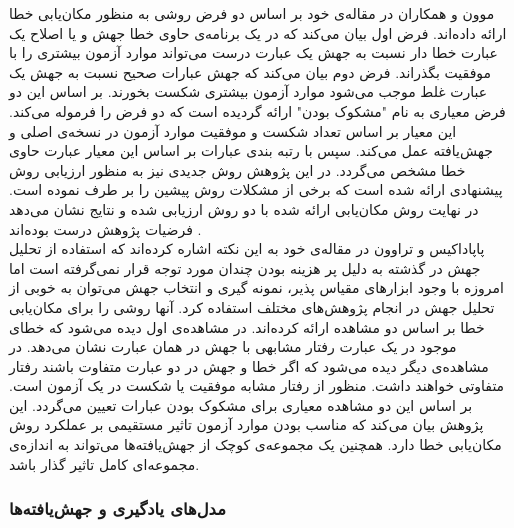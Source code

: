 موون و همکاران در مقاله‌ی خود بر اساس دو فرض روشی به منظور مکان‌یابی خطا ارائه داده‌اند. فرض اول بیان می‌کند که  در یک برنامه‌ی حاوی خطا جهش و یا اصلاح یک عبارت خطا دار نسبت به جهش یک عبارت درست می‌تواند موارد آزمون بیشتری را  با موفقیت بگذراند. فرض دوم  بیان می‌کند که جهش عبارات صحیح نسبت به جهش یک عبارت غلط موجب می‌شود موارد آزمون بیشتری شکست بخورند. بر اساس این دو فرض معیاری به نام "مشکوک بودن"  ارائه گردیده است که دو فرض را فرموله می‌کند. این معیار بر اساس تعداد شکست و موفقیت موارد آزمون در نسخه‌ی اصلی و جهش‌یافته عمل می‌کند. سپس با رتبه بندی عبارات بر اساس این معیار عبارت حاوی خطا مشخص می‌گردد. در این پژوهش روش جدیدی نیز به منظور ارزیابی روش پیشنهادی ارائه شده است که برخی از مشکلات روش پیشین را بر طرف نموده است. در نهایت روش مکان‌یابی ارائه شده با دو روش ارزیابی شده و نتایج نشان می‌دهد فرضیات پژوهش درست بوده‌اند \cite{moon2014ask}. \\

پاپاداکیس  و تراوون  در مقاله‌ی خود به این نکته اشاره کرده‌اند  که استفاده از تحلیل جهش در گذشته به دلیل پر هزینه بودن چندان مورد توجه قرار نمی‌گرفته است اما امروزه با وجود ابزارهای مقیاس پذیر، نمونه گیری و انتخاب جهش می‌توان به خوبی از تحلیل جهش در انجام پژوهش‌های مختلف استفاده کرد\cite{papadakis2015metallaxis}. آنها روشی را برای مکان‌یابی خطا بر اساس دو مشاهده ارائه کرده‌اند. در مشاهده‌ی اول دیده می‌شود که خطای موجود در یک عبارت رفتار مشابهی با جهش در همان عبارت نشان می‌دهد. در مشاهده‌ی دیگر دیده می‌شود که اگر  خطا و جهش در دو عبارت متفاوت باشند رفتار متفاوتی خواهند داشت. منظور از رفتار مشابه موفقیت یا شکست در یک آزمون است. بر اساس این دو مشاهده معیاری برای مشکوک بودن عبارات تعیین می‌گردد. این پژوهش بیان می‌کند که مناسب بودن موارد آزمون تاثیر مستقیمی بر عملکرد روش مکان‌یابی خطا  دارد. همچنین یک مجموعه‌ی کوچک از جهش‌یافته‌ها می‌تواند به اندازه‌ی مجموعه‌ای کامل تاثیر گذار باشد. \\

\subsubsection{مدل‌های یادگیری و جهش‌یافته‌ها}
 
